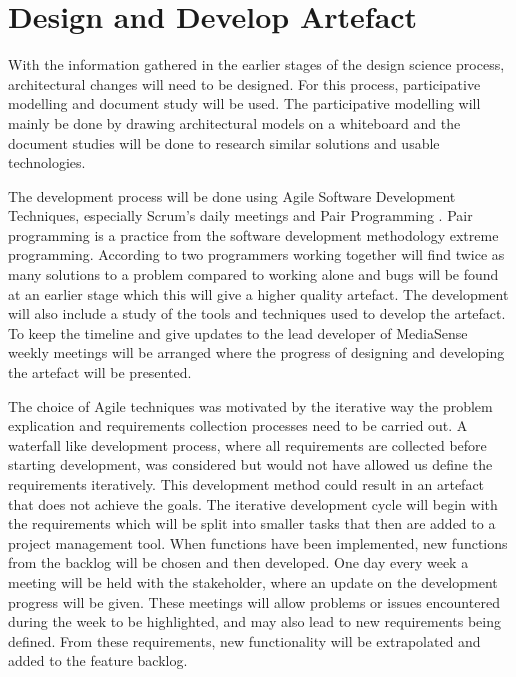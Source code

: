 \section{Design and Develop Artefact}
With the information gathered in the earlier stages of the design science process, architectural changes will need to be designed. For this process, participative modelling \cite{johannesson2012design} and document study will be used. The participative modelling will mainly be done by drawing architectural models on a whiteboard and the document studies will be done to research similar solutions and usable technologies. 

The development process will be done using Agile Software Development Techniques, especially Scrum's daily meetings \cite{kniberg2007scrum} and Pair Programming \cite{williams2000all}. 
Pair programming is a practice from the software development methodology extreme programming. According to  \cite{williams2000all} two programmers working together will find twice as many solutions to a problem compared to working alone and bugs will be found at an earlier stage which this will give a higher quality artefact. The development will also include a study of the tools and techniques used to develop the artefact. To keep the timeline and give updates to the lead developer of MediaSense weekly meetings will be arranged where the progress of designing and developing the artefact will be presented. 


The choice of Agile techniques was motivated by the iterative way the problem explication and requirements collection processes need to be carried out. A waterfall like development process, where all requirements are collected before starting development, was considered but would not have allowed us define the requirements iteratively. This development method could result in an artefact that does not achieve the goals.
The iterative development cycle will begin with the requirements which will be split into smaller tasks that then are added to a project management tool. When functions have been implemented, new functions from the backlog will be chosen and then developed. One day every week a meeting will be held with the stakeholder, where an update on the development progress will be given. These meetings will allow problems or issues encountered during the week to be highlighted, and may also lead to new requirements being defined. From these requirements, new functionality will be extrapolated and added to the feature backlog. 

